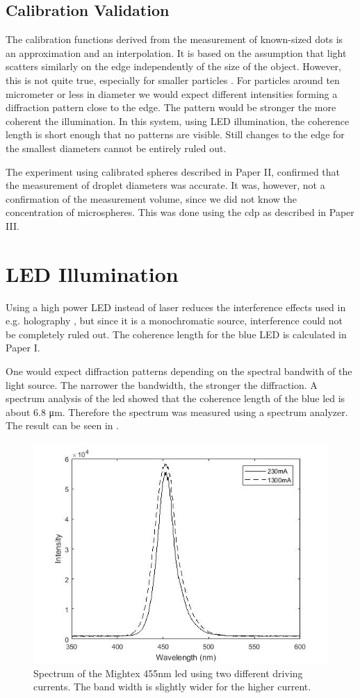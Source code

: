 \subsection{Calibration Validation}

The calibration functions derived from the measurement of known-sized dots is an approximation and an interpolation. It is based on the assumption that light scatters similarly on the edge independently of the size of the object. However, this is not quite true, especially for smaller particles \cite{bohr2008}. For particles around ten micrometer or less in diameter we would expect different intensities forming a diffraction pattern close to the edge. The pattern would be stronger the more coherent the illumination. In this system, using LED illumination, the coherence length is short enough that no patterns are visible. Still changes to the edge for the smallest diameters cannot be entirely ruled out.

The experiment using calibrated spheres described in Paper II, confirmed that the measurement of droplet diameters was accurate. It was, however, not a confirmation of the measurement volume, since we did not know the concentration of microspheres. This was done using the \gls{cdp} as described in Paper III.

\section{LED Illumination}

Using a high power LED instead of laser reduces the interference effects used in e.g. holography \cite{henn2013}, but since it is a monochromatic source, interference could not be completely ruled out. The coherence length for the blue LED is calculated in Paper I.

One would expect diffraction patterns depending on the spectral bandwith of the light source. The narrower the bandwidth, the stronger the diffraction. A spectrum analysis of the \gls{led} showed that the coherence length of the blue \gls{led} is about 6.8 μm. Therefore the spectrum was measured using a spectrum analyzer. The result can be seen in .

\begin{figure}%
\centering\includegraphics[width=0.6\linewidth]{figures/spektralanalys_mightex455nm}
\caption{Spectrum of the Mightex 455nm \gls{led} using two different driving currents. The band width is slightly wider for the higher current.}
\label{fig:ledspectrum}
\end{figure}

